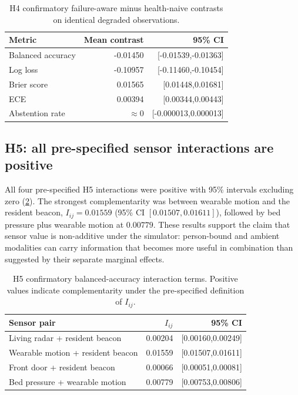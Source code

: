 \begin{table}[t]
\centering
\small
\caption{H4 confirmatory failure-aware minus health-naive contrasts on identical degraded observations.}
\label{tab:h4-confirmatory}
\begin{tabular}{lrr}
\toprule
Metric & Mean contrast & 95\% CI \\
\midrule
Balanced accuracy & -0.01450 & [-0.01539,-0.01363] \\
Log loss & -0.10957 & [-0.11460,-0.10454] \\
Brier score & 0.01565 & [0.01448,0.01681] \\
ECE & 0.00394 & [0.00344,0.00443] \\
Abstention rate & $\approx 0$ & [-0.000013,0.000013] \\
\bottomrule
\end{tabular}
\end{table}

\subsection{H5: all pre-specified sensor interactions are positive}

All four pre-specified H5 interactions were positive with 95\% intervals excluding zero (\cref{tab:h5-confirmatory}). The strongest complementarity was between wearable motion and the resident beacon, $I_{ij}=0.01559$ (95\% CI $[0.01507,0.01611]$), followed by bed pressure plus wearable motion at $0.00779$. These results support the claim that sensor value is non-additive under the simulator: person-bound and ambient modalities can carry information that becomes more useful in combination than suggested by their separate marginal effects.

\begin{table}[t]
\centering
\small
\caption{H5 confirmatory balanced-accuracy interaction terms. Positive values indicate complementarity under the pre-specified definition of $I_{ij}$.}
\label{tab:h5-confirmatory}
\begin{tabular}{lrr}
\toprule
Sensor pair & $I_{ij}$ & 95\% CI \\
\midrule
Living radar + resident beacon & 0.00204 & [0.00160,0.00249] \\
Wearable motion + resident beacon & 0.01559 & [0.01507,0.01611] \\
Front door + resident beacon & 0.00066 & [0.00051,0.00081] \\
Bed pressure + wearable motion & 0.00779 & [0.00753,0.00806] \\
\bottomrule
\end{tabular}
\end{table}
